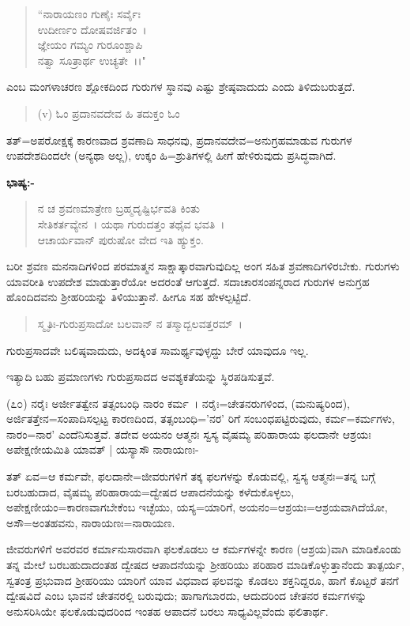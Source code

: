 \begin{verse}
``ನಾರಾಯಣಂ ಗುಣೈಃ ಸರ್ವೈಃ\\ ಉದೀರ್ಣಂ ದೋಷವರ್ಜಿತಂ~।\\ಜ್ಞೇಯಂ ಗಮ್ಯಂ ಗುರೂಂಶ್ಚಾಪಿ\\ ನತ್ವಾ ಸೂತ್ರಾರ್ಥ ಉಚ್ಯತೇ~।।"
\end{verse}

\noindent
ಎಂಬ ಮಂಗಳಾಚರಣ ಶ್ಲೋಕದಿಂದ ಗುರುಗಳ ಸ್ಥಾನವು ಎಷ್ಟು ಶ್ರೇಷ್ಠವಾದುದು ಎಂದು ತಿಳಿದುಬರುತ್ತದೆ.

\begin{verse}
(v) ಓಂ ಪ್ರದಾನವದೇವ ಹಿ ತದುಕ್ತಂ ಓಂ
\end{verse}

ತತ್=ಅಪರೋಕ್ಷಕ್ಕೆ ಕಾರಣವಾದ ಶ್ರವಣಾದಿ ಸಾಧನವು, ಪ್ರದಾನವದೇವ=ಅನುಗ್ರಹಮಾಡುವ ಗುರುಗಳ ಉಪದೇಶದಿಂದಲೇ (ಅನ್ಯಥಾ ಅಲ್ಲ), ಉಕ್ಕಂ ಹಿ=ಶ್ರುತಿಗಳಲ್ಲಿ ಹೀಗೆ ಹೇಳಿರುವುದು ಪ್ರಸಿದ್ಧವಾಗಿದೆ.

\noindent
\textbf{ಭಾಷ್ಯ:-}

\begin{verse}
ನ ಚ ಶ್ರವಣಮಾತ್ರೇಣ ಬ್ರಹ್ಮದೃಷ್ಟಿರ್ಭವತಿ ಕಿಂತು\\ ಸೇತಿಕರ್ತವ್ಯೇನ~। ಯಥಾ ಗುರುದತ್ತಂ ತಥೈವ ಭವತಿ~।\\ ಆಚಾರ್ಯವಾನ್ ಪುರುಷೋ ವೇದ ಇತಿ ಹ್ಯುಕ್ತಂ.
\end{verse}

ಬರೀ ಶ್ರವಣ ಮನನಾದಿಗಳಿಂದ ಪರಮಾತ್ಮನ ಸಾಕ್ಷಾತ್ಕಾರವಾಗುವುದಿಲ್ಲ ಅಂಗ ಸಹಿತ ಶ್ರವಣಾದಿಗಳಿರಬೇಕು. ಗುರುಗಳು ಯಾವರೀತಿ ಉಪದೇಶ ಮಾಡುತ್ತಾರೆಯೋ ಅದರಂತೆ ಆಗುತ್ತದೆ. ಸದಾಚಾರಸಂಪನ್ನರಾದ ಗುರುಗಳ ಅನುಗ್ರಹ ಹೊಂದಿದವನು ಶ‍್ರೀಹರಿಯನ್ನು ತಿಳಿಯುತ್ತಾನೆ. ಹೀಗೂ ಸಹ ಹೇಳಲ್ಪಟ್ಟಿದೆ.

\begin{verse}
ಸ್ಮೃತಿಃ-ಗುರುಪ್ರಸಾದೋ ಬಲವಾನ್ ನ ತಸ್ಮಾದ್ಬಲವತ್ತರಮ್~।
\end{verse}

ಗುರುಪ್ರಸಾದವೇ ಬಲಿಷ್ಠವಾದುದು, ಅದಕ್ಕಿಂತ ಸಾಮರ್ಥ್ಯವುಳ್ಳದ್ದು ಬೇರೆ ಯಾವುದೂ ಇಲ್ಲ.

ಇತ್ಯಾದಿ ಬಹು ಪ್ರಮಾಣಗಳು ಗುರುಪ್ರಸಾದದ ಅವಶ್ಯಕತೆಯನ್ನು ಸ್ಥಿರಪಡಿಸುತ್ತವೆ.

(೭೦) ನರೈಃ ಅರ್ಜೀತತ್ವೇನ ತತ್ಸಂಬಂಧಿ ನಾರಂ ಕರ್ಮ~। ನರೈಃ=ಚೇತನರುಗಳಿಂದ, (ಮನುಷ್ಯರಿಂದ), ಅರ್ಜಿತತ್ತೇನ=ಸಂಪಾದಿಸಲ್ಪಟ್ಟ ಕಾರಣದಿಂದ, ತತ್ಸಂಬಂಧಿ='ನರ' ರಿಗೆ ಸಂಬಂಧಪಟ್ಟಿರುವುದು, ಕರ್ಮ=ಕರ್ಮಗಳು, ನಾರಂ=ನಾರ' ಎಂದೆನಿಸುತ್ತವೆ. ತದೇವ ಅಯನಂ ಆತ್ಮನಃ ಸ್ವಸ್ಯ ವೈಷಮ್ಯ ಪರಿಹಾರಾಯ ಫಲದಾನೇ ಆಶ್ರಯಃ ಅಪೇಕ್ಷಣೀಯಮಿತಿ ಯಾವತ್ | ಯಸ್ಯಾಸೌ ನಾರಾಯಣಃ-

ತತ್ ಏವ=ಆ ಕರ್ಮವೇ, ಫಲದಾನೇ=ಜೀವರುಗಳಿಗೆ ತಕ್ಕ ಫಲಗಳನ್ನು ಕೊಡುವಲ್ಲಿ, ಸ್ವಸ್ಯ ಆತ್ಮನಃ=ತನ್ನ ಬಗ್ಗೆ ಬರಬಹುದಾದ, ವೈಷಮ್ಯ ಪರಿಹಾರಾಯ=ದ್ವೇಷದ ಆಪಾದನೆಯನ್ನು ಕಳೆದುಕೊಳ್ಳಲು, ಅಪೇಕ್ಷಣೀಯಂ=ಕಾರಣವಾಗಬೇಕೆಂಬ ಇಚ್ಛೆಯು, ಯಸ್ಯ=ಯಾರಿಗೆ, ಅಯನಂ=ಆಶ್ರಯಃ=ಆಶ್ರಯವಾಗಿದೆಯೋ, ಅಸೌ=ಅಂತಹವನು, ನಾರಾಯಣಃ=ನಾರಾಯಣ.

ಜೀವರುಗಳಿಗೆ ಅವರವರ ಕರ್ಮಾನುಸಾರವಾಗಿ ಫಲಕೊಡಲು ಆ ಕರ್ಮಗಳನ್ನೇ ಕಾರಣ (ಆಶ್ರಯ)ವಾಗಿ ಮಾಡಿಕೊಂಡು ತನ್ನ ಮೇಲೆ ಬರಬಹುದಾದಂತಹ ದ್ವೇಷದ ಆಪಾದನೆಯನ್ನು ಶ‍್ರೀಹರಿಯು ಪರಿಹಾರ ಮಾಡಿಕೊಳ್ಳುತ್ತಾನೆಂದು ತಾತ್ಪರ್ಯ, ಸ್ವತಂತ್ರ ಪ್ರಭುವಾದ ಶ‍್ರೀಹರಿಯು ಯಾರಿಗೆ ಯಾವ ವಿಧವಾದ ಫಲವನ್ನು ಕೊಡಲು ಶಕ್ತನಿದ್ದರೂ, ಹಾಗೆ ಕೊಟ್ಟರೆ ತನಗೆ ದ್ವೇಷವಿದೆ ಎಂಬ ಭಾವನೆ ಚೇತನರಲ್ಲಿ ಬರುವುದು; ಹಾಗಾಗಬಾರದು, ಆದುದರಿಂದ ಚೇತನರ ಕರ್ಮಗಳನ್ನು ಅನುಸರಿಸಿಯೇ ಫಲಕೊಡುವುದರಿಂದ ಇಂತಹ ಆಪಾದನೆ ಬರಲು ಸಾಧ್ಯವಿಲ್ಲವೆಂದು ಫಲಿತಾರ್ಥ.

